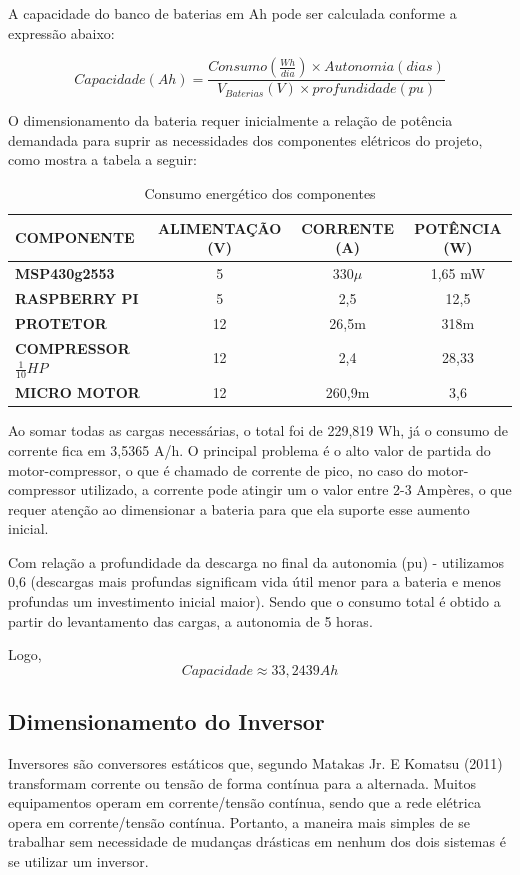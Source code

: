 	A capacidade do banco de baterias em Ah pode ser calculada conforme a expressão abaixo: 
	
	\begin{equation}
	Capacidade(Ah) = \frac{Consumo(\frac{Wh}{dia}) \times Autonomia(dias)}{V_{Baterias}(V)\times profundidade(pu)}
	\end{equation}

O dimensionamento da bateria requer inicialmente a relação de potência demandada para suprir as necessidades dos componentes elétricos do projeto, como mostra a tabela a seguir:

\begin{table}[H]
\caption{Consumo energético dos componentes}
\begin{tabular}{|p{4 cm} |c |c |c |}
 \hline
   \textbf{COMPONENTE} &\textbf{ALIMENTAÇÃO (V)}  &\textbf{CORRENTE (A)} & \textbf{POTÊNCIA (W)} \\
   \hline
  \textbf{MSP430g2553} &5 & 330$\mu$& 1,65 mW \\
   \hline
   \textbf{RASPBERRY PI}&5 &2,5 & 12,5 \\
   \hline
  \textbf{PROTETOR } &12 &26,5m &318m \\
   \hline
  \textbf{COMPRESSOR $\frac{1}{10}HP$} &12 & 2,4& 28,33 \\
   \hline
  \textbf{MICRO MOTOR} &12 &260,9m &3,6  \\
   \hline

\end{tabular}
\end{table}

Ao somar todas as cargas necessárias, o total foi de 229,819 Wh, já o consumo de corrente fica em 3,5365 A/h. O principal problema é o alto valor de partida do motor-compressor, o que é chamado de corrente de pico, no caso do motor-compressor utilizado, a corrente pode atingir um o valor entre 2-3 Ampères, o que requer atenção ao dimensionar a bateria para que ela suporte esse aumento inicial.


Com relação a profundidade da descarga no final da autonomia (pu) - utilizamos 0,6 (descargas mais profundas significam vida útil menor para a bateria e menos profundas um investimento inicial maior). Sendo que o consumo total é obtido a partir do levantamento das cargas, a autonomia de 5 horas.

Logo, 
$$
Capacidade \approx 33,2439 Ah
$$


\subsection{Dimensionamento do Inversor}
Inversores são conversores estáticos que, segundo Matakas Jr. E Komatsu (2011) transformam corrente ou tensão de forma contínua para a alternada. Muitos equipamentos operam em corrente/tensão contínua, sendo que a rede elétrica opera em corrente/tensão contínua. Portanto, a maneira mais simples de se trabalhar sem necessidade de mudanças drásticas em nenhum dos dois sistemas é se utilizar um inversor.

